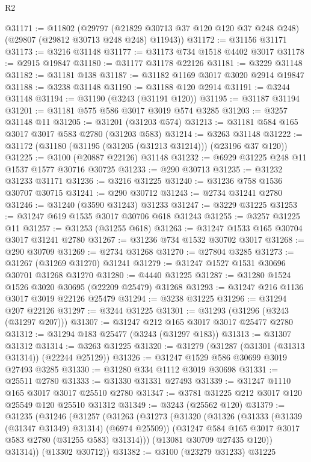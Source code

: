 \begin{lexlean}{R2}
\begin{coremodule}
@31171 := @11802
    (@29797 (@21829 @30713 @37 @120 @120 @37 @248 @248) (@29807 (@29812 @30713 @248 @248) @11943))
@31172 := @31156 @31171
@31173 := @3216 @31148
@31177 := @31173 @734 @1518 @4402 @3017
@31178 := @2915 @19847
@31180 := @31177 @31178 @22126
@31181 := @3229 @31148
@31182 := @31181 @138
@31187 := @31182 @1169 @3017 @3020 @2914 @19847
@31188 := @3238 @31148
@31190 := @31188 @120 @2914
@31191 := @3244 @31148
@31194 := @31190 (@3243 (@31191 @120))
@31195 := @31187 @31194
@31201 := @31181 @575 @586 @3017 @3019 @574 @3285
@31203 := @3257 @31148 @11
@31205 := @31201 (@31203 @574)
@31213 := @31181 @584 @165 @3017 @3017 @583 @2780 (@31203 @583)
@31214 := @3263 @31148
@31222 := @31172 (@31180 (@31195 (@31205 (@31213 @31214))) (@23196 @37 @120))
@31225 := @3100 (@20887 @22126) @31148
@31232 := @6929 @31225 @248 @11 @1537 @1577 @30716 @30725
@31233 := @290 @30713
@31235 := @31232 @31233 @31171
@31236 := @3216 @31225
@31240 := @31236 @758 @1536 @30707 @30715
@31241 := @290 @30712
@31243 := @2734 @31241 @2780
@31246 := @31240 (@3590 @31243) @31233
@31247 := @3229 @31225
@31253 := @31247 @619 @1535 @3017 @30706 @618 @31243
@31255 := @3257 @31225 @11
@31257 := @31253 (@31255 @618)
@31263 := @31247 @1533 @165 @30704 @3017 @31241 @2780
@31267 := @31236 @734 @1532 @30702 @3017
@31268 := @290 @30709
@31269 := @2734 @31268
@31270 := @27804 @3285
@31273 := @31267 (@31269 @31270) @31241
@31279 := @31247 @1527 @1531 @30696 @30701 @31268 @31270
@31280 := @4440 @31225
@31287 := @31280 @1524 @1526 @3020 @30695 (@22209 @25479) @31268
@31293 := @31247 @216 @1136 @3017 @3019 @22126 @25479
@31294 := @3238 @31225
@31296 := @31294 @207 @22126
@31297 := @3244 @31225
@31301 := @31293 (@31296 (@3243 (@31297 @207)))
@31307 := @31247 @212 @165 @3017 @3017 @25477 @2780
@31312 := @31294 @183 @25477 (@3243 (@31297 @183))
@31313 := @31307 @31312
@31314 := @3263 @31225
@31320 := @31279 (@31287 (@31301 (@31313 @31314)) (@22244 @25129))
@31326 := @31247 @1529 @586 @30699 @3019 @27493 @3285
@31330 := @31280 @334 @1112 @3019 @30698
@31331 := @25511 @2780
@31333 := @31330 @31331 @27493
@31339 := @31247 @1110 @165 @3017 @3017 @25510 @2780
@31347 := @3781 @31225 @212 @3017 @120 @25549 @120 @25510 @31312
@31349 := @3243 (@25562 @120)
@31379 := @31235
    (@31246
      (@31257
        (@31263
          (@31273
            (@31320
              (@31326
                (@31333 (@31339 (@31347 @31349) @31314) (@6974 @25509))
                (@31247 @584 @165 @3017 @3017 @583 @2780 (@31255 @583) @31314)))
            (@13081 @30709 @27435 @120))
          @31314))
      (@13302 @30712))
@31382 := @3100 (@23279 @31233) @31225

\end{coremodule}
\end{lexlean}
